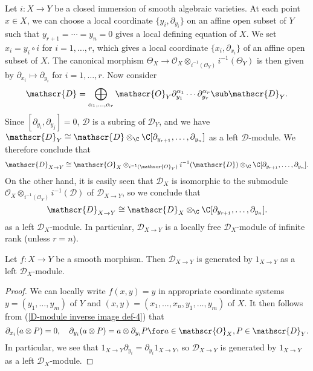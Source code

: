 \begin{example}\label{D-module closed immersion relative inverse module}
Let $i:X\to Y$ be a closed immersion of smooth algebraic varieties. At each point $x\in X$, we can choose a local coordinate $\{y_i,\partial_{y_i}\}$ on an affine open subset of $Y$ such that $y_{r+1}=\cdots=y_n=0$ gives a local defining equation of $X$. We set $x_i=y_i\circ i$ for $i=1,\dots,r$, which gives a local coordinate $\{x_i,\partial_{x_i}\}$ of an affine open subset of $X$. The canonical morphism $\Theta_X\to\mathscr{O}_X\otimes_{i^{-1}(\mathscr{O}_Y)}i^{-1}(\Theta_Y)$ is then given by $\partial_{x_i}\mapsto\partial_{y_i}$ for $i=1,\dots,r$. Now consider
\[\mathscr{D}=\bigoplus_{\alpha_1,\dots,\alpha_r}\mathscr{O}_Y\partial_{y_1}^{\alpha_1}\cdots\partial_{y_r}^{\alpha_r}\sub\mathscr{D}_Y.\]
Since $[\partial_{y_i},\partial_{y_j}]=0$, $\mathscr{D}$ is a subring of $\mathscr{D}_Y$, and we have $\mathscr{D}_Y\cong\mathscr{D}\otimes_{\C}\C[\partial_{y_{r+1}},\dots,\partial_{y_n}]$ as a left $\mathscr{D}$-module. We therefore conclude that
\[\mathscr{D}_{X\to Y}\cong \mathscr{O}_X\otimes_{i^{-1}(\mathscr{O}_Y)}i^{-1}(\mathscr{D})\otimes_{\C}\C[\partial_{y_{r+1}},\dots,\partial_{y_n}].\]
On the other hand, it is easily seen that $\mathscr{D}_X$ is isomorphic to the submodule $\mathscr{O}_X\otimes_{i^{-1}(\mathscr{O}_Y)}i^{-1}(\mathscr{D})$ of $\mathscr{D}_{X\to Y}$, so we conclude that
\begin{equation}\label{D-module closed immersion relative inverse module-1}
\mathscr{D}_{X\to Y}\cong\mathscr{D}_X\otimes_{\C}\C[\partial_{y_{r+1}},\dots,\partial_{y_n}].
\end{equation}
as a left $\mathscr{D}_X$-module. In particular, $\mathscr{D}_{X\to Y}$ is a locally free $\mathscr{D}_X$-module of infinite rank (unless $r=n$).
\end{example}

\begin{proposition}\label{D-module smooth morphism relative D-module}
Let $f:X\to Y$ be a smooth morphism. Then $\mathscr{D}_{X\to Y}$ is generated by $1_{X\to Y}$ as a left $\mathscr{D}_X$-module.
\end{proposition}
\begin{proof}
We can locally write $f(x,y)=y$ in appropriate coordinate systems $y=(y_1,\dots,y_m)$ of $Y$ and $(x,y)=(x_1,\dots,x_n,y_1,\dots,y_m)$ of $X$. It then follows from (\ref{D-module inverse image def-4}) that
\[\partial_{x_i}(a\otimes P)=0,\quad \partial_{y_i}(a\otimes P)=a\otimes\partial_{y_i}P\for a\in\mathscr{O}_X,P\in\mathscr{D}_Y.\]
In particular, we see that $1_{X\to Y}\partial_{y_i}=\partial_{y_i}1_{X\to Y}$, so $\mathscr{D}_{X\to Y}$ is generated by $1_{X\to Y}$ as a left $\mathscr{D}_X$-module.
\end{proof}

